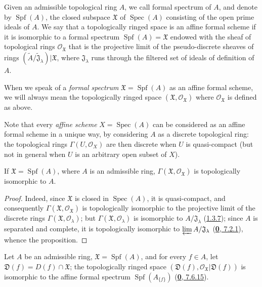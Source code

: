 \begin{definition}[10.1.2]
\label{I.10.1.2}
Given an admissible topological ring $A$, we call formal spectrum
of $A$, and denote by $\operatorname{Spf}(A)$, the closed subspace
$\mathfrak{X}$ of $\operatorname{Spec}(A)$ consisting of the open prime
ideals of $A$. We say that a topologically ringed space is an affine formal
scheme if it is isomorphic to a formal spectrum
$\operatorname{Spf}(A)=\mathfrak{X}$ endowed with the sheaf of topological
rings $\mathscr{O}_{\mathfrak{X}}$ that is the projective limit of the
pseudo-discrete sheaves of rings
$(\widetilde{A}/\widetilde{\mathfrak{J}}_\lambda)|\mathfrak{X}$, where
$\mathfrak{J}_\lambda$ runs through the filtered set of ideals of
definition of $A$.
\end{definition}

When we speak of a \emph{formal spectrum}
$\mathfrak{X}=\operatorname{Spf}(A)$ as an affine formal scheme, we will
always mean the topologically ringed space
$(\mathfrak{X},\mathscr{O}_{\mathfrak{X}})$ where
$\mathscr{O}_{\mathfrak{X}}$ is defined as above.

Note that every \emph{affine scheme} $X=\operatorname{Spec}(A)$ can be
considered as an affine formal scheme in a unique way, by considering
$A$ as a discrete topological ring: the topological rings
$\Gamma(U,\mathscr{O}_X)$ are then discrete when $U$ is
quasi-compact (but not in general when $U$ is an arbitrary open subset of
$X$).

\begin{proposition}[10.1.3]
\label{I.10.1.3}
If $\mathfrak{X}=\operatorname{Spf}(A)$, where $A$ is an admissible ring,
$\Gamma(\mathfrak{X},\mathscr{O}_{\mathfrak{X}})$ is topologically
isomorphic to $A$.
\end{proposition}

\begin{proof}
Indeed, since $\mathfrak{X}$ is closed in $\operatorname{Spec}(A)$, it
is quasi-compact, and consequently
$\Gamma(\mathfrak{X},\mathscr{O}_{\mathfrak{X}})$ is topologically
isomorphic to the projective limit of the discrete rings
$\Gamma(\mathfrak{X},\mathscr{O}_\lambda)$; but
$\Gamma(\mathfrak{X},\mathscr{O}_\lambda)$ is isomorphic to
$A/\mathfrak{J}_\lambda$ (\hyperref[I.1.3.7]{1.3.7}); since $A$ is
separated and complete, it is topologically isomorphic to
$\varprojlim A/\mathfrak{J}_\lambda$
(\hyperref[0.7.2.1]{\textbf{0}, 7.2.1}), whence the proposition.
\end{proof}

\begin{proposition}[10.1.4]
\label{I.10.1.4}
Let $A$ be an admissible ring, $\mathfrak{X}=\operatorname{Spf}(A)$, and
for every $f\in A$, let
$\mathfrak{D}(f)=D(f)\cap\mathfrak{X}$; the topologically ringed space
$(\mathfrak{D}(f),\mathscr{O}_{\mathfrak{X}}|\mathfrak{D}(f))$ is
isomorphic to the affine formal spectrum
$\operatorname{Spf}(A_{\{f\}})$
\textup{(\hyperref[0.7.6.15]{\textbf{0}, 7.6.15})}.
\end{proposition}

